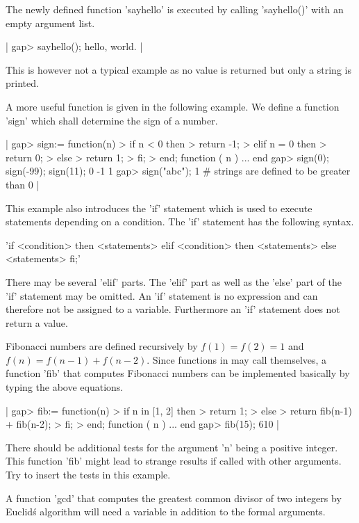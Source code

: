 The newly defined function 'sayhello' is executed by calling 'sayhello()'
with an empty argument list.

|    gap> sayhello();
    hello, world. |

This is however not a typical example as no  value is returned but only a
string is printed.

A  more useful function is given in the following  example.   We define a
function 'sign' which shall determine the sign of a number.

|    gap> sign:= function(n)
    >        if n < 0 then
    >           return -1;
    >        elif n = 0 then
    >           return 0;
    >        else
    >           return 1;
    >        fi;
    >    end;
    function ( n ) ... end
    gap> sign(0); sign(-99); sign(11);
    0
    -1
    1
    gap> sign("abc");
    1        # strings are defined to be greater than 0 |

This example also introduces the 'if' statement which is  used to execute
statements  depending  on  a  condition.   The  'if'  statement  has  the
following syntax.

'if <condition> then <statements> elif <condition> then <statements> else
<statements> fi;'

There may be several 'elif' parts.  The 'elif' part as well as the 'else'
part  of the  'if' statement may be omitted.   An  'if'  statement  is no
expression and  can therefore not be assigned to a variable.  Furthermore
an 'if' statement does not return a value.

Fibonacci numbers are defined recursively by $f(1) = f(2) =  1$ and $f(n)
=  f(n-1) + f(n-2)$.  Since  functions in {\GAP} may call  themselves,  a
function  'fib'  that  computes  Fibonacci  numbers  can  be  implemented
basically by typing the above equations.

|    gap> fib:= function(n)
    >       if n in [1, 2] then
    >          return 1;
    >       else
    >          return fib(n-1) + fib(n-2);
    >       fi;
    >    end;
    function ( n ) ... end
    gap> fib(15);
    610 |

There should be additional tests for the  argument  'n' being  a positive
integer.   This  function 'fib' might  lead to strange  results if called
with other arguments.  Try to insert the tests in this example.

A  function  'gcd'  that computes the   greatest  common  divisor of  two
integers  by Euclid\'s algorithm will need  a variable in addition to the
formal arguments.

